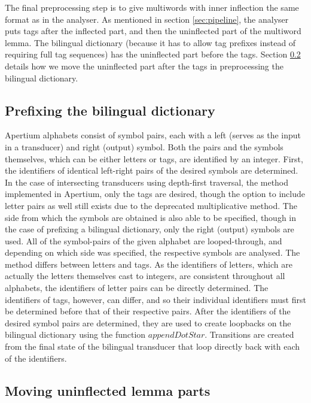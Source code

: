 \documentclass[10pt, a4paper]{article}
\begin{document}
The final preprocessing step is to give multiwords with inner
inflection the same format as in the analyser. As mentioned in section
\ref{sec:pipeline}, the analyser puts tags after the inflected part,
and then the uninflected part of the multiword lemma. The bilingual
dictionary (because it has to allow tag prefixes instead of requiring
full tag sequences) has the uninflected part before the tags. Section
\ref{sec:lemqmove} details how we move the uninflected part after the
tags in preprocessing the bilingual dictionary.

\subsection{Prefixing the bilingual dictionary}

Apertium alphabets consist of symbol pairs, each with a left (serves
as the input in a transducer) and right (output) symbol. Both the
pairs and the symbols themselves, which can be either letters or tags,
are identified by an integer. First, the identifiers of identical
left-right pairs of the desired symbols are determined. In the case of
intersecting transducers using depth-first traversal, the method
implemented in Apertium, only the tags are desired, though the option
to include letter pairs as well still exists due to the deprecated
multiplicative method. The side from which the symbols are obtained is
also able to be specified, though in the case of prefixing a bilingual
dictionary, only the right (output) symbols are used. All of the
symbol-pairs of the given alphabet are looped-through, and depending
on which side was specified, the respective symbols are analysed. The
method differs between letters and tags. As the identifiers of
letters, which are actually the letters themselves cast to integers,
are consistent throughout all alphabets, the identifiers of letter
pairs can be directly determined. The identifiers of tags, however,
can differ, and so their individual identifiers must first be
determined before that of their respective pairs. After the
identifiers of the desired symbol pairs are determined, they are used
to create loopbacks on the bilingual dictionary using the function
$appendDotStar$. Transitions are created from the final state
of the bilingual transducer that loop directly back with each of the
identifiers.

\subsection{Moving uninflected lemma parts}
\label{sec:lemqmove}
\end{document}
